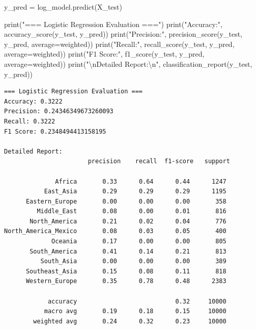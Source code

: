 \documentclass[
  letterpaper,
  DIV=11,
  numbers=noendperiod]{scrartcl}
\newenvironment{Shaded}{\begin{snugshade}}{\end{snugshade}}
\newcommand{\BuiltInTok}[1]{\textcolor[rgb]{0.00,0.23,0.31}{#1}}
\newcommand{\CharTok}[1]{\textcolor[rgb]{0.13,0.47,0.30}{#1}}
\newcommand{\NormalTok}[1]{\textcolor[rgb]{0.00,0.23,0.31}{#1}}
\newcommand{\OperatorTok}[1]{\textcolor[rgb]{0.37,0.37,0.37}{#1}}
\newcommand{\StringTok}[1]{\textcolor[rgb]{0.13,0.47,0.30}{#1}}
\begin{document}
\begin{Shaded}
\begin{Highlighting}[]
\NormalTok{y\_pred }\OperatorTok{=}\NormalTok{ log\_model.predict(X\_test)}

\BuiltInTok{print}\NormalTok{(}\StringTok{"=== Logistic Regression Evaluation ==="}\NormalTok{)}
\BuiltInTok{print}\NormalTok{(}\StringTok{"Accuracy:"}\NormalTok{, accuracy\_score(y\_test, y\_pred))}
\BuiltInTok{print}\NormalTok{(}\StringTok{"Precision:"}\NormalTok{, precision\_score(y\_test, y\_pred, average}\OperatorTok{=}\StringTok{\textquotesingle{}weighted\textquotesingle{}}\NormalTok{))}
\BuiltInTok{print}\NormalTok{(}\StringTok{"Recall:"}\NormalTok{, recall\_score(y\_test, y\_pred, average}\OperatorTok{=}\StringTok{\textquotesingle{}weighted\textquotesingle{}}\NormalTok{))}
\BuiltInTok{print}\NormalTok{(}\StringTok{"F1 Score:"}\NormalTok{, f1\_score(y\_test, y\_pred, average}\OperatorTok{=}\StringTok{\textquotesingle{}weighted\textquotesingle{}}\NormalTok{))}
\BuiltInTok{print}\NormalTok{(}\StringTok{"}\CharTok{\textbackslash{}n}\StringTok{Detailed Report:}\CharTok{\textbackslash{}n}\StringTok{"}\NormalTok{, classification\_report(y\_test, y\_pred))}
\end{Highlighting}
\end{Shaded}

\begin{verbatim}
=== Logistic Regression Evaluation ===
Accuracy: 0.3222
Precision: 0.24346349673260093
Recall: 0.3222
F1 Score: 0.2348494413158195

Detailed Report:
                       precision    recall  f1-score   support

              Africa       0.33      0.64      0.44      1247
           East_Asia       0.29      0.29      0.29      1195
      Eastern_Europe       0.00      0.00      0.00       358
         Middle_East       0.08      0.00      0.01       816
       North_America       0.21      0.02      0.04       776
North_America_Mexico       0.08      0.03      0.05       400
             Oceania       0.17      0.00      0.00       805
       South_America       0.41      0.14      0.21       813
          South_Asia       0.00      0.00      0.00       389
      Southeast_Asia       0.15      0.08      0.11       818
      Western_Europe       0.35      0.78      0.48      2383

            accuracy                           0.32     10000
           macro avg       0.19      0.18      0.15     10000
        weighted avg       0.24      0.32      0.23     10000
\end{verbatim}
\end{document}
